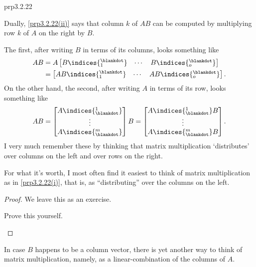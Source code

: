 \begin{prp}{}{prp3.2.22}
\begin{rmk}
		Dually, \cref{prp3.2.22(ii)} says that column $k$ of $AB$ can be computed by multiplying row $k$ of $A$ on the right by $B$.
	\end{rmk}
	\begin{rmk}
		The first, after writing $B$ in terms of its columns, looks something like
		\begin{equation}
			\begin{split}
				AB & =A\begin{bmatrix}B\indices{^{\blankdot}_1} & \cdots & B\indices{^{\blankdot}_o}\end{bmatrix} \\
				& =\begin{bmatrix}AB\indices{^{\blankdot}_1} & \cdots & AB\indices{^{\blankdot}_o}\end{bmatrix}.
			\end{split}
		\end{equation}
		On the other hand, the second, after writing $A$ in terms of its row, looks something like
		\begin{equation}
			AB=\begin{bmatrix}A\indices{^1_{\blankdot}} \\ \vdots \\ A\indices{^m_{\blankdot}}\end{bmatrix}B=\begin{bmatrix}A\indices{^1_{\blankdot}}B \\ \vdots \\ A\indices{^m_{\blankdot}}B\end{bmatrix}.
		\end{equation}
		I very much remember these by thinking that matrix multiplication `distributes' over columns on the left and over rows on the right.
	\end{rmk}
	\begin{rmk}
		For what it's worth, I most often find it easiest to think of matrix multiplication as in \cref{prp3.2.22(i)}, that is, as ``distributing'' over the columns on the left.
	\end{rmk}
	\begin{proof}
		We leave this as an exercise.
		\begin{exr}[breakable=false]{}{}
			Prove this yourself.
		\end{exr}
	\end{proof}
\end{prp}
In case $B$ happens to be a column vector, there is yet another way to think of matrix multiplication, namely, as a linear-combination of the columns of $A$.
